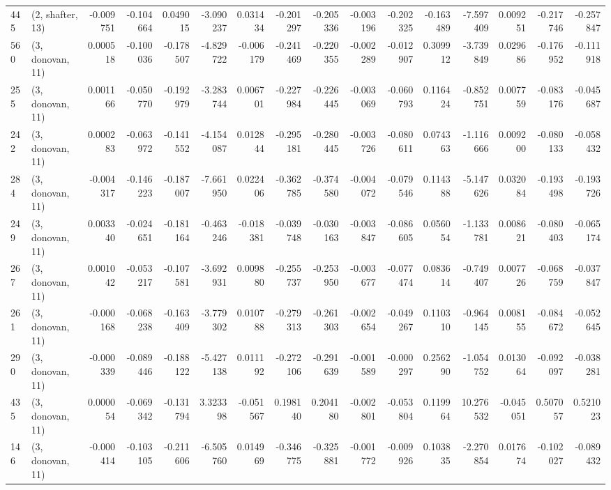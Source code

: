 \begin{tabular}{llrrrrrrrrrrrrrr}
445 &  (2, shafter, 13) &  -0.009751 & -0.104664 &  0.049015 &   -3.090237 &  0.031434 &  -0.201297 & -0.205336 & -0.003196 & -0.202325 & -0.163489 &   -7.597409 &  0.009251 & -0.217746 & -0.257847 \\
560 &  (3, donovan, 11) &   0.000518 & -0.100036 & -0.178507 &   -4.829722 & -0.006179 &  -0.241469 & -0.220355 & -0.002289 & -0.012907 &  0.309912 &   -3.739849 &  0.029686 & -0.176952 & -0.111918 \\
255 &  (3, donovan, 11) &   0.001166 & -0.050770 & -0.192979 &   -3.283744 &  0.006701 &  -0.227984 & -0.226445 & -0.003069 & -0.060793 &  0.116424 &   -0.852751 &  0.007759 & -0.083176 & -0.045687 \\
242 &  (3, donovan, 11) &   0.000283 & -0.063972 & -0.141552 &   -4.154087 &  0.012844 &  -0.295181 & -0.280445 & -0.003726 & -0.080611 &  0.074363 &   -1.116666 &  0.009200 & -0.080133 & -0.058432 \\
284 &  (3, donovan, 11) &  -0.004317 & -0.146223 & -0.187007 &   -7.661950 &  0.022406 &  -0.362785 & -0.374580 & -0.004072 & -0.079546 &  0.114388 &   -5.147626 &  0.032084 & -0.193498 & -0.193726 \\
249 &  (3, donovan, 11) &   0.003340 & -0.024651 & -0.181164 &   -0.463246 & -0.018381 &  -0.039748 & -0.030163 & -0.003847 & -0.086605 &  0.056054 &   -1.133781 &  0.008621 & -0.080403 & -0.065174 \\
267 &  (3, donovan, 11) &   0.001042 & -0.053217 & -0.107581 &   -3.692931 &  0.009880 &  -0.255737 & -0.253950 & -0.003677 & -0.077474 &  0.083614 &   -0.749407 &  0.007726 & -0.068759 & -0.037847 \\
261 &  (3, donovan, 11) &  -0.000168 & -0.068238 & -0.163409 &   -3.779302 &  0.010788 &  -0.279313 & -0.261303 & -0.002654 & -0.049267 &  0.110310 &   -0.964145 &  0.008155 & -0.084672 & -0.052645 \\
290 &  (3, donovan, 11) &  -0.000339 & -0.089446 & -0.188122 &   -5.427138 &  0.011192 &  -0.272106 & -0.291639 & -0.001589 & -0.000297 &  0.256290 &   -1.054752 &  0.013064 & -0.092097 & -0.038281 \\
435 &  (3, donovan, 11) &   0.000054 & -0.069342 & -0.131794 &    3.323398 & -0.051567 &   0.198140 &  0.204180 & -0.002801 & -0.053804 &  0.119964 &   10.276532 & -0.045051 &  0.507057 &  0.521023 \\
146 &  (3, donovan, 11) &  -0.000414 & -0.103105 & -0.211606 &   -6.505760 &  0.014969 &  -0.346775 & -0.325881 & -0.001772 & -0.009926 &  0.103835 &   -2.270854 &  0.017674 & -0.102027 & -0.089432 \\

\end{tabular}
